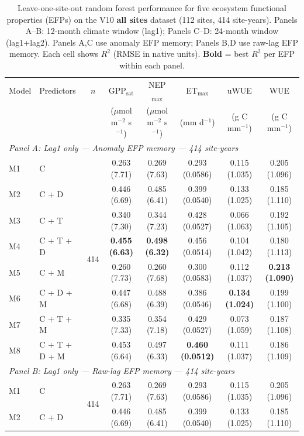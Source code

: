 \begin{table}[htbp]
\centering
\caption{Leave-one-site-out random forest performance for five ecosystem functional properties (EFPs) on the V10 \textbf{all sites} dataset (112 sites, 414 site-years). Panels A--B: 12-month climate window (lag1); Panels C--D: 24-month window (lag1+lag2). Panels A,C use anomaly EFP memory; Panels B,D use raw-lag EFP memory. Each cell shows $R^2$ (RMSE in native units). \textbf{Bold} = best $R^2$ per EFP within each panel.}
\label{tab:RF_LOSO_v10_all_sites}
\footnotesize
\setlength{\tabcolsep}{4pt}
\begin{tabular}{llcccccc}
\toprule
Model & Predictors & $n$ & GPP$_\mathrm{sat}$ & NEP$_\mathrm{max}$ & ET$_\mathrm{max}$ & uWUE & WUE \\
  &  &  & ($\mu$mol m$^{-2}$ s$^{-1}$) & ($\mu$mol m$^{-2}$ s$^{-1}$) & (mm d$^{-1}$) & (g C mm$^{-1}$) & (g C mm$^{-1}$) \\
\midrule
\multicolumn{8}{l}{\textit{Panel A: Lag1 only --- Anomaly EFP memory --- 414 site-years}} \\
\midrule
M1 & C & \multirow{8}{*}{414} & 0.263 (7.71) & 0.269 (7.63) & 0.293 (0.0586) & 0.115 (1.035) & 0.205 (1.096) \\
M2 & C + D &  & 0.446 (6.69) & 0.485 (6.41) & 0.399 (0.0540) & 0.133 (1.025) & 0.185 (1.110) \\
M3 & C + T &  & 0.340 (7.30) & 0.344 (7.23) & 0.428 (0.0527) & 0.066 (1.063) & 0.192 (1.105) \\
M4 & C + T + D &  & \textbf{0.455 (6.63)} & \textbf{0.498 (6.32)} & 0.456 (0.0514) & 0.104 (1.042) & 0.180 (1.113) \\
M5 & C + M &  & 0.260 (7.73) & 0.260 (7.68) & 0.300 (0.0583) & 0.112 (1.037) & \textbf{0.213 (1.090)} \\
M6 & C + D + M &  & 0.447 (6.68) & 0.488 (6.39) & 0.386 (0.0546) & \textbf{0.134 (1.024)} & 0.199 (1.100) \\
M7 & C + T + M &  & 0.335 (7.33) & 0.354 (7.18) & 0.429 (0.0527) & 0.073 (1.059) & 0.187 (1.108) \\
M8 & C + T + D + M &  & 0.453 (6.64) & 0.497 (6.33) & \textbf{0.460 (0.0512)} & 0.111 (1.037) & 0.186 (1.109) \\
\midrule
\multicolumn{8}{l}{\textit{Panel B: Lag1 only --- Raw-lag EFP memory --- 414 site-years}} \\
\midrule
M1 & C & \multirow{8}{*}{414} & 0.263 (7.71) & 0.269 (7.63) & 0.293 (0.0586) & 0.115 (1.035) & 0.205 (1.096) \\
M2 & C + D &  & 0.446 (6.69) & 0.485 (6.41) & 0.399 (0.0540) & 0.133 (1.025) & 0.185 (1.110) \\

\end{tabular}
\end{table}
